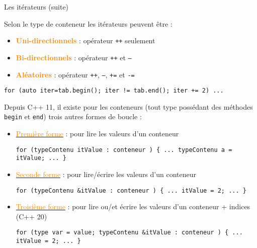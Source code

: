 \documentclass[compress,10pt,aspectratio=169]{beamer}
\begin{document}
\begin{frame}[fragile]{Les itérateurs (suite)}
    \scriptsize

Selon le type de conteneur les itérateurs peuvent être :
\begin{itemize}
\item \textbf{\textcolor{darkorange}{Uni-directionnels}} : opérateur \texttt{++} seulement
\item \textbf{\textcolor{darkorange}{Bi-directionnels}}  : opérateur \texttt{++} et \texttt{--}
\item \textbf{\textcolor{darkorange}{Aléatoires}} : opérateur \texttt{++}, \texttt{--}, \texttt{+=} et \texttt{-=}
\end{itemize}

\begin{verbatim}
for (auto iter=tab.begin(); iter != tab.end(); iter += 2) ...
\end{verbatim}

Depuis C++ 11, il existe pour les conteneurs (tout type possédant des méthodes \texttt{begin} et \texttt{end}) trois autres formes de boucle :
\begin{itemize}
\item \underline{\textcolor{darkorange}{Première forme}} : pour lire les valeurs d'un conteneur
\begin{verbatim}
for (typeContenu itValue : conteneur ) { ... typeContenu a = itValue; ... }
\end{verbatim}
\item \underline{\textcolor{darkorange}{Seconde forme}} : pour lire/écrire les valeurs d'un conteneur
\begin{verbatim}
for (typeContenu &itValue : conteneur ) { ... itValue = 2; ... }
\end{verbatim}
\item \underline{\textcolor{darkorange}{Troisième forme}} : pour lire ou/et écrire les valeurs d'un conteneur + indices (C++ 20)
\begin{verbatim}
for (type var = value; typeContenu &itValue : conteneur ) { ... itValue = 2; ... }
\end{verbatim}
\end{itemize}
\end{frame}
\end{document}
